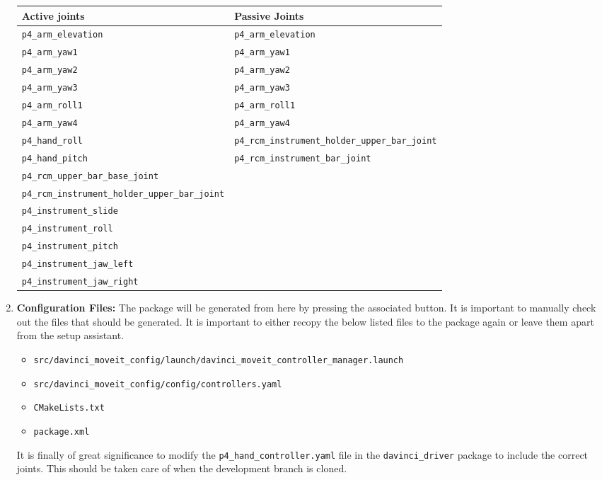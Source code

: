 \begin{enumerate}
\begin{table}[H]
\hspace{1cm}\begin{tabular}{l|l}
\textbf{Active joints} & \textbf{Passive Joints} \\
\hline
 \texttt{p4\_arm\_elevation} & \texttt{p4\_arm\_elevation} \\
  \texttt{p4\_arm\_yaw1} & \texttt{p4\_arm\_yaw1} \\
   \texttt{p4\_arm\_yaw2} & \texttt{p4\_arm\_yaw2} \\
    \texttt{p4\_arm\_yaw3} & \texttt{p4\_arm\_yaw3} \\
     \texttt{p4\_arm\_roll1} & \texttt{p4\_arm\_roll1} \\
      \texttt{p4\_arm\_yaw4} & \texttt{p4\_arm\_yaw4} \\
       \texttt{p4\_hand\_roll} & \texttt{p4\_rcm\_instrument\_holder\_upper\_bar\_joint} \\
        \texttt{p4\_hand\_pitch} & \texttt{p4\_rcm\_instrument\_bar\_joint} \\
          \texttt{p4\_rcm\_upper\_bar\_base\_joint} &  \\
   \texttt{p4\_rcm\_instrument\_holder\_upper\_bar\_joint} & \\
    \texttt{p4\_instrument\_slide} & \\
     \texttt{p4\_instrument\_roll} &  \\
      \texttt{p4\_instrument\_pitch} & \\
       \texttt{p4\_instrument\_jaw\_left} & \\
        \texttt{p4\_instrument\_jaw\_right} & \\
\end{tabular}
\end{table}
\item \textbf{Configuration Files:} The package will be generated from here by pressing the associated button. It is important to manually check out the files that should be generated. It is important to either recopy the below listed files to the package again or leave them apart from the setup assistant.
\begin{itemize}
	\item \texttt{src/davinci\_moveit\_config/launch/davinci\_moveit\_controller\_manager.launch}
	\item \texttt{src/davinci\_moveit\_config/config/controllers.yaml}
	\item \texttt{CMakeLists.txt}
	\item \texttt{package.xml}
\end{itemize}
It is finally of great significance to modify the \texttt{p4\_hand\_controller.yaml} file in the \texttt{davinci\_driver} package to include the correct joints. This should be taken care of when the development branch is cloned.
\end{enumerate}
